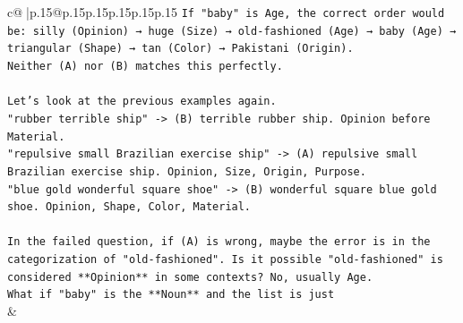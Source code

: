 \documentclass{article}
\begin{document}
{\begin{supertabular}{c@{$\;$}|p{.15\linewidth}@{}p{.15\linewidth}p{.15\linewidth}p{.15\linewidth}p{.15\linewidth}p{.15\linewidth}}
{{{\texttt{If "baby" is Age, the correct order would be: silly (Opinion) → huge (Size) → old{-}fashioned (Age) → baby (Age) → triangular (Shape) → tan (Color) → Pakistani (Origin).} \\
\texttt{Neither (A) nor (B) matches this perfectly.} \\
\\ 
\texttt{Let's look at the previous examples again.} \\
\texttt{"rubber terrible ship" {-}> (B) terrible rubber ship. Opinion before Material.} \\
\texttt{"repulsive small Brazilian exercise ship" {-}> (A) repulsive small Brazilian exercise ship. Opinion, Size, Origin, Purpose.} \\
\texttt{"blue gold wonderful square shoe" {-}> (B) wonderful square blue gold shoe. Opinion, Shape, Color, Material.} \\
\\ 
\texttt{In the failed question, if (A) is wrong, maybe the error is in the categorization of "old{-}fashioned". Is it possible "old{-}fashioned" is considered **Opinion** in some contexts? No, usually Age.} \\
\texttt{What if "baby" is the **Noun** and the list is just} \\
            }
        }
    }
    & \\ \\

\end{supertabular}
}
\end{document}
